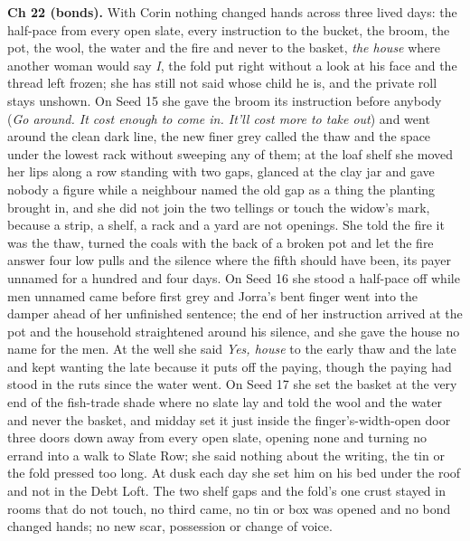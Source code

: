 \documentclass{design/chronicle}
\begin{document}
{\textbf{Ch 22 (bonds).} With Corin nothing changed hands across three lived days: the half-pace from every open slate, every instruction to the bucket, the broom, the pot, the wool, the water and the fire and never to the basket, \emph{the house} where another woman would say \emph{I}, the fold put right without a look at his face and the thread left frozen; she has still not said whose child he is, and the private roll stays unshown. On Seed 15 she gave the broom its instruction before anybody (\emph{Go around. It cost enough to come in. It’ll cost more to take out}) and went around the clean dark line, the new finer grey called the thaw and the space under the lowest rack without sweeping any of them; at the loaf shelf she moved her lips along a row standing with two gaps, glanced at the clay jar and gave nobody a figure while a neighbour named the old gap as a thing the planting brought in, and she did not join the two tellings or touch the widow’s mark, because a strip, a shelf, a rack and a yard are not openings. She told the fire it was the thaw, turned the coals with the back of a broken pot and let the fire answer four low pulls and the silence where the fifth should have been, its payer unnamed for a hundred and four days. On Seed 16 she stood a half-pace off while men unnamed came before first grey and Jorra’s bent finger went into the damper ahead of her unfinished sentence; the end of her instruction arrived at the pot and the household straightened around his silence, and she gave the house no name for the men. At the well she said \emph{Yes, house} to the early thaw and the late and kept wanting the late because it puts off the paying, though the paying had stood in the ruts since the water went. On Seed 17 she set the basket at the very end of the fish-trade shade where no slate lay and told the wool and the water and never the basket, and midday set it just inside the finger’s-width-open door three doors down away from every open slate, opening none and turning no errand into a walk to Slate Row; she said nothing about the writing, the tin or the fold pressed too long. At dusk each day she set him on his bed under the roof and not in the Debt Loft. The two shelf gaps and the fold’s one crust stayed in rooms that do not touch, no third came, no tin or box was opened and no bond changed hands; no new scar, possession or change of voice.

}
\end{document}
